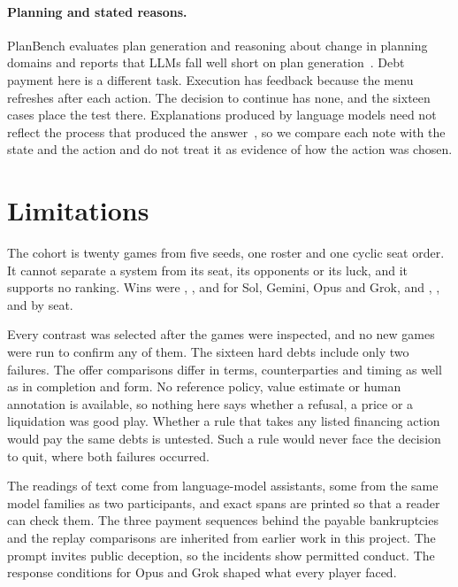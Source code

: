 \paragraph{Planning and stated reasons.}
PlanBench evaluates plan generation and reasoning about change in planning domains and reports that LLMs fall well short on plan generation~\cite{valmeekam2023planbench}. Debt payment here is a different task. Execution has feedback because the menu refreshes after each action. The decision to continue has none, and the sixteen cases place the test there. Explanations produced by language models need not reflect the process that produced the answer~\cite{turpin2023unfaithful,lanham2023faithfulness}, so we compare each note with the state and the action and do not treat it as evidence of how the action was chosen.

\section{Limitations}
\label{sec:limits}

The cohort is twenty games from five seeds, one roster and one cyclic seat order. It cannot separate a system from its seat, its opponents or its luck, and it supports no ranking. Wins were , ,  and  for Sol, Gemini, Opus and Grok, and , ,  and  by seat.

Every contrast was selected after the games were inspected, and no new games were run to confirm any of them. The sixteen hard debts include only two failures. The offer comparisons differ in terms, counterparties and timing as well as in completion and form. No reference policy, value estimate or human annotation is available, so nothing here says whether a refusal, a price or a liquidation was good play. Whether a rule that takes any listed financing action would pay the same debts is untested. Such a rule would never face the decision to quit, where both failures occurred.

The readings of text come from language-model assistants, some from the same model families as two participants, and exact spans are printed so that a reader can check them. The three payment sequences behind the payable bankruptcies and the replay comparisons are inherited from earlier work in this project. The prompt invites public deception, so the incidents show permitted conduct. The response conditions for Opus and Grok shaped what every player faced.

